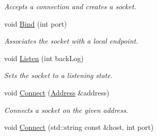 \begin{DoxyCompactItemize}
\begin{DoxyCompactList}\small\item\em Accepts a connection and creates a socket. \end{DoxyCompactList}\item 
void \hyperlink{class_common_1_1_socket_base_a5ac8f268c4f54938020823311472b082}{Bind} (int port)
\begin{DoxyCompactList}\small\item\em Associates the socket with a local endpoint. \end{DoxyCompactList}\item 
void \hyperlink{class_common_1_1_socket_base_af7bb8eb4ea1fac57d78b850f353cab41}{Listen} (int back\-Log)
\begin{DoxyCompactList}\small\item\em Sets the socket to a listening state. \end{DoxyCompactList}\item 
\hypertarget{class_common_1_1_socket_base_a9018b85960affcedf32541f9f8ffcd84}{void \hyperlink{class_common_1_1_socket_base_a9018b85960affcedf32541f9f8ffcd84}{Connect} (\hyperlink{class_common_1_1_address}{Address} \&address)}\label{class_common_1_1_socket_base_a9018b85960affcedf32541f9f8ffcd84}

\begin{DoxyCompactList}\small\item\em Connects a socket on the given address. \end{DoxyCompactList}\item 
\hypertarget{class_common_1_1_socket_base_a01645452e874dbf03d95d5abb5a35dcc}{void \hyperlink{class_common_1_1_socket_base_a01645452e874dbf03d95d5abb5a35dcc}{Connect} (std\-::string const \&host, int port)}\label{class_common_1_1_socket_base_a01645452e874dbf03d95d5abb5a35dcc}


\end{DoxyCompactItemize}
